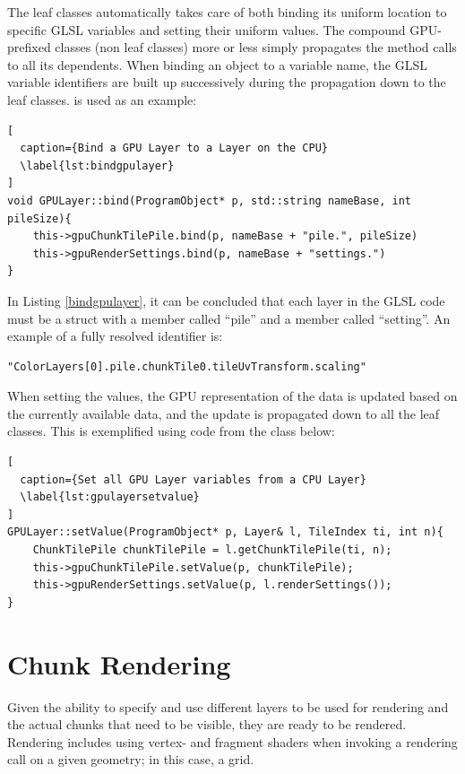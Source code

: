The leaf classes automatically takes care of both binding its uniform location to specific GLSL variables and  setting their uniform values. The compound GPU-prefixed classes (non leaf classes) more or less simply propagates the method calls to all its dependents. When binding an object to a variable name, the GLSL variable identifiers are built up successively during the propagation down to the leaf classes.  is used as an example:\\

\begin{lstlisting}[
  caption={Bind a GPU Layer to a Layer on the CPU} 
  \label{lst:bindgpulayer}
]
void GPULayer::bind(ProgramObject* p, std::string nameBase, int pileSize){
	this->gpuChunkTilePile.bind(p, nameBase + "pile.", pileSize)
	this->gpuRenderSettings.bind(p, nameBase + "settings.")
}
\end{lstlisting}

In Listing \ref{bindgpulayer}, it can be concluded that each layer in the GLSL code must be a struct with a member called ``pile'' and a member called ``setting''. An example of a fully resolved identifier is: \\

\begin{lstlisting}[]
"ColorLayers[0].pile.chunkTile0.tileUvTransform.scaling"
\end{lstlisting}

When setting the values, the GPU representation of the data is updated based on the currently available  data, and the update is propagated down to all the leaf classes. This is exemplified using code from the  class below:\\

\begin{lstlisting}[
  caption={Set all GPU Layer variables from a CPU Layer} 
  \label{lst:gpulayersetvalue}
]
GPULayer::setValue(ProgramObject* p, Layer& l, TileIndex ti, int n){
	ChunkTilePile chunkTilePile = l.getChunkTilePile(ti, n);
	this->gpuChunkTilePile.setValue(p, chunkTilePile);
	this->gpuRenderSettings.setValue(p, l.renderSettings());
}
\end{lstlisting}

\section{Chunk Rendering}

Given the ability to specify and use different layers to be used for rendering and the actual chunks that need to be visible, they are ready to be rendered. Rendering includes using vertex- and fragment shaders when invoking a rendering call on a given geometry; in this case, a grid.

